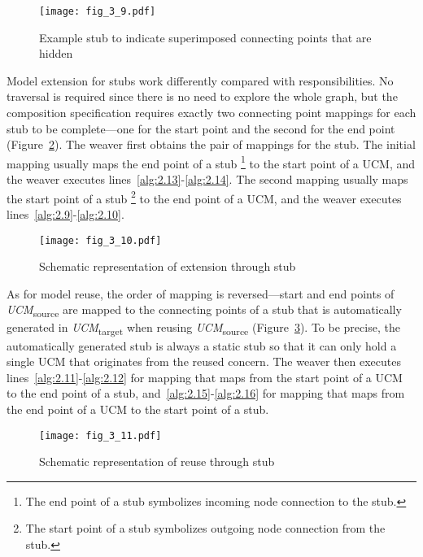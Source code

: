 \begin{figure}[h]
	\centering
	\texttt{[image: fig\_3\_9.pdf]}
	\caption{Example stub to indicate superimposed connecting points that are hidden}
	\label{fig:3.9}
\end{figure}

Model extension for stubs work differently compared with responsibilities. No traversal is required since there is no need to explore the whole graph, but the composition specification requires exactly two connecting point mappings for each stub to be complete---one for the start point and the second for the end point (Figure~\ref{fig:3.10}). The weaver first obtains the pair of mappings for the stub. The initial mapping usually maps the end point of a stub \footnote{The end point of a stub symbolizes incoming node connection to the stub.} to the start point of a UCM, and the weaver executes lines~\ref{alg:2.13}-\ref{alg:2.14}. The second mapping usually maps the start point of a stub \footnote{The start point of a stub symbolizes outgoing node connection from the stub.} to the end point of a UCM, and the weaver executes lines~\ref{alg:2.9}-\ref{alg:2.10}.

\begin{figure}[h]
	\centering
	\texttt{[image: fig\_3\_10.pdf]}
	\caption{Schematic representation of extension through stub}
	\label{fig:3.10}
\end{figure}

As for model reuse, the order of mapping is reversed---start and end points of \emph{UCM}\textsubscript{source} are mapped to the connecting points of a stub that is automatically generated in \emph{UCM}\textsubscript{target} when reusing \emph{UCM}\textsubscript{source} (Figure~\ref{fig:3.11}). To be precise, the automatically generated stub is always a static stub so that it can only hold a single UCM that originates from the reused concern. The weaver then executes lines~\ref{alg:2.11}-\ref{alg:2.12} for mapping that maps from the start point of a UCM to the end point of a stub, and~\ref{alg:2.15}-\ref{alg:2.16} for mapping that maps from the end point of a UCM to the start point of a stub.

\begin{figure}[h]
	\centering
	\texttt{[image: fig\_3\_11.pdf]}
	\caption{Schematic representation of reuse through stub}
	\label{fig:3.11}
\end{figure}

